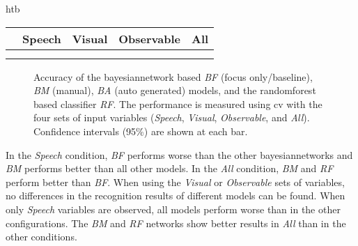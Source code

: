 \begin{colored_table}{htb}
    \centering
    \DTLsetseparator{,}  
    \begin{tabulary}{\textwidth}{C C C C C}
    \toprule
     & Speech & Visual & Observable & All
    \\
    \bottomrule
    \end{tabulary}
    \caption[One vs. all cross validation values.]{\label{fig:study-addressee-bn-cv-val} 
    Accuracy with 95\% confidence interval of the \gls{bayesiannetwork} based \emph{BF} (focus only/baseline), \emph{BM} (manual), \emph{BA} (auto generated) models, and the \gls{randomforest} based classifier \emph{RF}.
    The performance is measured using \gls{cv} with the four sets of input variables (\emph{Speech}, \emph{Visual}, \emph{Observable}, and \emph{All}).
    }
\end{colored_table}

\begin{figure}[tbh]
  \centering
  
    \caption[One vs. all cross validation results.]{\label{fig:study-addressee-bn-cv} 
    Accuracy of the \gls{bayesiannetwork} based \emph{BF} (focus only/baseline), \emph{BM} (manual), \emph{BA} (auto generated) models, and the \gls{randomforest} based classifier \emph{RF}.
    The performance is measured using \gls{cv} with the four sets of input variables (\emph{Speech}, \emph{Visual}, \emph{Observable}, and \emph{All}). Confidence intervals (95\%) are shown at each bar.
    }
\end{figure}

In the \emph{Speech} condition, \emph{BF} performs worse than the other \glspl{bayesiannetwork} and \emph{BM} performs better than all other models.
In the \emph{All} condition, \emph{BM} and \emph{RF} perform better than \emph{BF}.
When using the \emph{Visual} or \emph{Observable} sets of variables, no differences in the recognition results of different models can be found.
When only \emph{Speech} variables are observed, all models perform worse than in the other configurations.
The \emph{BM} and \emph{RF} networks show better results in \emph{All} than in the other conditions.

